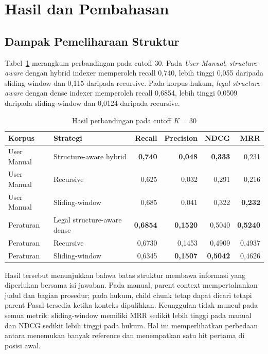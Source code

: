 \section{Hasil dan Pembahasan}

\subsection{Dampak Pemeliharaan Struktur}

Tabel~\ref{tab:hasil-chunker-paper} merangkum perbandingan \chunker{} pada cutoff 30. Pada \textit{User Manual}, \textit{structure-aware} dengan hybrid indexer memperoleh recall 0,740, lebih tinggi 0,055 daripada sliding-window dan 0,115 daripada recursive. Pada korpus hukum, \textit{legal structure-aware} dengan dense indexer memperoleh recall 0,6854, lebih tinggi 0,0509 daripada sliding-window dan 0,0124 daripada recursive.

\begin{table}[t]
\centering
\caption{Hasil perbandingan \chunker{} pada cutoff $K=30$}
\label{tab:hasil-chunker-paper}
\scriptsize
\begin{tabular}{@{}llrrrr@{}}
\toprule
\textbf{Korpus} & \textbf{Strategi} & \textbf{Recall} & \textbf{Precision} & \textbf{NDCG} & \textbf{MRR}\\
\midrule
User Manual & Structure-aware hybrid & \textbf{0,740} & \textbf{0,048} & \textbf{0,333} & 0,231\\
User Manual & Recursive & 0,625 & 0,032 & 0,291 & 0,216\\
User Manual & Sliding-window & 0,685 & 0,041 & 0,322 & \textbf{0,232}\\
Peraturan & Legal structure-aware dense & \textbf{0,6854} & \textbf{0,1520} & 0,5040 & \textbf{0,5240}\\
Peraturan & Recursive & 0,6730 & 0,1453 & 0,4909 & 0,4937\\
Peraturan & Sliding-window & 0,6345 & \textbf{0,1507} & \textbf{0,5042} & 0,4626\\
\bottomrule
\end{tabular}
\end{table}

Hasil tersebut menunjukkan bahwa batas struktur membawa informasi yang diperlukan bersama isi jawaban. Pada manual, parent context mempertahankan judul dan bagian prosedur; pada hukum, child chunk tetap dapat dicari tetapi parent Pasal tersedia ketika konteks dipulihkan. Keunggulan tidak muncul pada semua metrik: sliding-window memiliki MRR sedikit lebih tinggi pada manual dan NDCG sedikit lebih tinggi pada hukum. Hal ini memperlihatkan perbedaan antara menemukan banyak reference dan menempatkan satu hit pertama di posisi awal.

